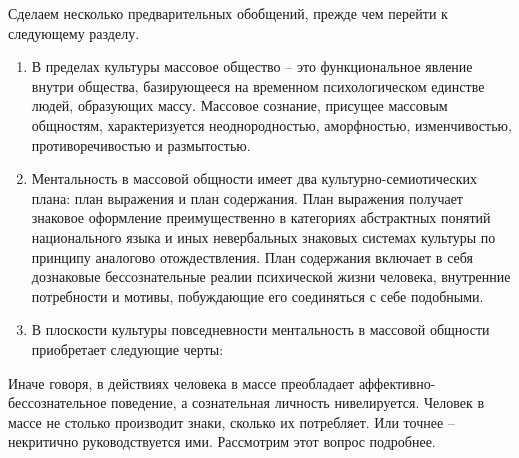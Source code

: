 Сделаем несколько предварительных обобщений, прежде чем перейти к следующему разделу.
\begin{enumerate}
    \item В пределах культуры массовое общество – это функциональное явление внутри общества,
    базирующееся на временном психологическом единстве людей, образующих массу. Массовое сознание,
    присущее массовым общностям, характеризуется неоднородностью, аморфностью, изменчивостью,
    противоречивостью и размытостью.
    \item Ментальность в массовой общности имеет два культурно-семиотических плана: план выражения и план содержания.
    План выражения получает знаковое оформление преимущественно в категориях абстрактных понятий
    национального языка и иных невербальных знаковых системах культуры по принципу аналогово отождествления.
    План содержания включает в себя дознаковые бессознательные реалии психической жизни человека, внутренние
    потребности и мотивы, побуждающие его соединяться с себе подобными.
    \item В плоскости культуры повседневности ментальность в массовой общности приобретает следующие черты:
\end{enumerate}

Иначе говоря, в действиях человека в массе преобладает аффективно-бессознательное поведение, а сознательная личность нивелируется. Человек в массе не столько производит знаки, сколько их потребляет.  Или точнее -- некритично руководствуется ими. Рассмотрим этот вопрос подробнее.
